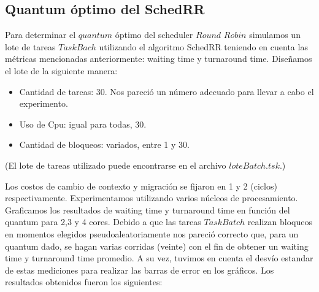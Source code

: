 \subsection{Quantum óptimo del SchedRR}

Para determinar el $quantum$ óptimo del scheduler $Round$ $Robin$ simulamos un lote de tareas $TaskBach$ utilizando el algoritmo SchedRR teniendo en cuenta las métricas mencionadas anteriormente: waiting time y turnaround time. Diseñamos el lote de la siguiente manera:
\begin{itemize}
	\item Cantidad de tareas: 30. Nos pareció un número adecuado para llevar a cabo el experimento.
	\item Uso de Cpu: igual para todas, 30.
	\item Cantidad de bloqueos: variados, entre 1 y 30.
\end{itemize}
(El lote de tareas utilizado puede encontrarse en el archivo $loteBatch.tsk$.)

Los costos de cambio de contexto y migración se fijaron en 1 y 2 (ciclos) respectivamente. Experimentamos utilizando varios núcleos de procesamiento.
Graficamos los resultados de waiting time y turnaround time en función del quantum para 2,3 y 4 cores. Debido a que las tareas $TaskBatch$ realizan bloqueos en momentos elegidos pseudoaleatoriamente nos pareció correcto que, para un quantum dado, se hagan varias corridas (veinte) con el fin de obtener un waiting time y turnaround time promedio. A su vez, tuvimos en cuenta el desvío estandar de estas mediciones para realizar las barras de error en los gráficos. Los resultados obtenidos fueron los siguientes:

